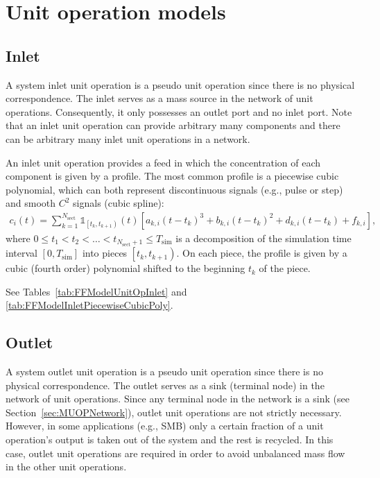 \section{Unit operation models}

\subsection{Inlet}\label{sec:MUOPInlet}

A system inlet unit operation  is a pseudo unit operation since there is no physical correspondence.
The inlet serves as a mass source in the network of unit operations.
Consequently, it only possesses an outlet port and no inlet port.
Note that an inlet unit operation can provide arbitrary many components and there can be arbitrary many inlet unit operations in a network.

An inlet unit operation provides a feed in which the concentration of each component is given by a profile.
The most common profile is a piecewise cubic polynomial, which can both represent discontinuous signals (e.g., pulse or step) and smooth $C^2$ signals (cubic spline):
\begin{align*}
	c_i(t) = \sum_{k = 1}^{N_{\text{sect}}} \mathds{1}_{\left[t_k, t_{k+1} \right)}(t) \left[ a_{k,i} \left( t - t_k \right)^3 + b_{k,i} \left( t - t_k \right)^2 + d_{k,i} \left( t - t_k \right) + f_{k,i} \right],
\end{align*}
where $0 \leq t_1 < t_2 < \dots < t_{N_{\text{sect}} + 1} \leq T_{\text{sim}}$ is a decomposition of the simulation time interval $\left[0, T_{\text{sim}}\right]$ into pieces $\left[t_k, t_{k+1} \right)$.
On each piece, the profile is given by a cubic (fourth order) polynomial shifted to the beginning $t_k$ of the piece.

See Tables~\ref{tab:FFModelUnitOpInlet} and \ref{tab:FFModelInletPiecewiseCubicPoly}.

\subsection{Outlet}\label{sec:MUOPOutlet}

A system outlet unit operation  is a pseudo unit operation since there is no physical correspondence.
The outlet serves as a sink (terminal node) in the network of unit operations.
Since any terminal node in the network is a sink (see Section~\ref{sec:MUOPNetwork}), outlet unit operations are not strictly necessary.
However, in some applications (e.g., SMB) only a certain fraction of a unit operation's output is taken out of the system and the rest is recycled.
In this case, outlet unit operations are required in order to avoid unbalanced mass flow in the other unit operations.

